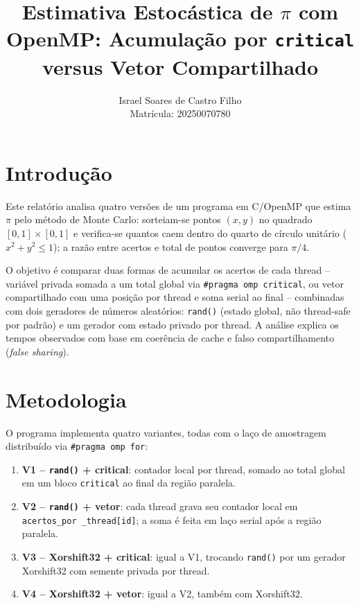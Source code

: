 \documentclass[a4paper,12pt]{article}
\title{Estimativa Estocástica de $\pi$ com OpenMP: Acumulação por \texttt{critical} versus Vetor Compartilhado}
\author{Israel Soares de Castro Filho \\ Matrícula: 20250070780}
\date{}
\begin{document}
\maketitle

\section{Introdução}

Este relatório analisa quatro versões de um programa em C/OpenMP que estima $\pi$ pelo método de Monte
Carlo: sorteiam-se pontos $(x,y)$ no quadrado $[0,1]\times[0,1]$ e verifica-se quantos caem dentro do
quarto de círculo unitário ($x^2+y^2 \le 1$); a razão entre acertos e total de pontos converge para
$\pi/4$.

O objetivo é comparar duas formas de acumular os acertos de cada thread -- variável privada somada a um
total global via \texttt{\#pragma omp critical}, ou vetor compartilhado com uma posição por thread e soma
serial ao final -- combinadas com dois geradores de números aleatórios: \texttt{rand()} (estado global,
não thread-safe por padrão) e um gerador com estado privado por thread. A análise explica os tempos
observados com base em coerência de cache e falso compartilhamento (\textit{false sharing}).

\section{Metodologia}

O programa implementa quatro variantes, todas com o laço de amostragem distribuído via
\texttt{\#pragma omp for}:

\begin{enumerate}
    \item \textbf{V1 -- \texttt{rand()} + critical}: contador local por thread, somado ao total global em
    um bloco \texttt{critical} ao final da região paralela.
    \item \textbf{V2 -- \texttt{rand()} + vetor}: cada thread grava seu contador local em \texttt{acertos\_por
    \_thread[id]}; 
    a soma é feita em laço serial após a região paralela.
    \item \textbf{V3 -- Xorshift32 + critical}: igual a V1, trocando \texttt{rand()} por um gerador
    Xorshift32 com semente privada por thread.
    \item \textbf{V4 -- Xorshift32 + vetor}: igual a V2, também com Xorshift32.
\end{enumerate}
\end{document}
